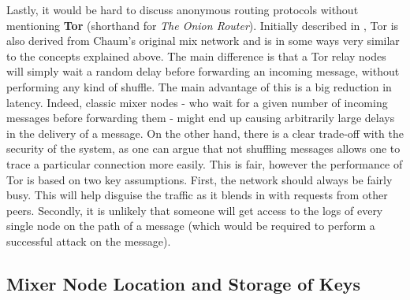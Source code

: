 \documentclass[11pt, a4paper]{article}
\begin{document}

        Lastly, it would be hard to discuss anonymous routing protocols without mentioning \textbf{Tor} (shorthand for \textit{The Onion Router}).
        Initially described in \cite{tor}, Tor is also derived from Chaum's original mix network and is in some ways very similar to the concepts explained above.
        The main difference is that a Tor relay nodes will simply wait a random delay before forwarding an incoming message, without performing any kind of shuffle.
        The main advantage of this is a big reduction in latency.
        Indeed, classic mixer nodes - who wait for a given number of incoming messages before forwarding them - might end up causing arbitrarily large delays in the delivery of a message.
        On the other hand, there is a clear trade-off with the security of the system, as one can argue that not shuffling messages allows one to trace a particular connection more easily.
        This is fair, however the performance of Tor is based on two key assumptions.
        First, the network should always be fairly busy.
        This will help disguise the traffic as it blends in with requests from other peers.
        Secondly, it is unlikely that someone will get access to the logs of every single node on the path of a message (which would be required to perform a successful attack on the message).

        \subsection{Mixer Node Location and Storage of Keys}
\end{document}
